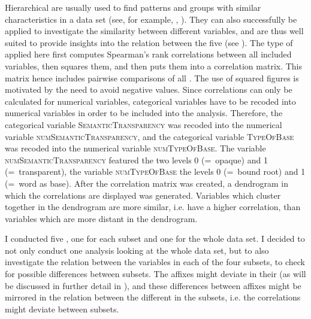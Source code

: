 Hierarchical  are usually used to find patterns and groups with similar characteristics in a data  set (see, for example, \citealt[chapter 5.1.5]{Baayen.2008}, \citealt[chapter 8.1]{Zumel.2014}). They can also successfully be applied to investigate the similarity between different variables, and are thus well suited to provide insights into the relation between the five  (see \citealt[200 f.]{Baayen.2008}). 
The type of  applied here first computes Spearman's rank correlations between all included variables, then squares them, and then puts them into a correlation matrix. This matrix hence includes pairwise comparisons of all . The use of squared figures is motivated by the need to avoid negative values.
Since correlations can only be calculated for numerical variables,  categorical variables have to be recoded into numerical variables in order to be included into the analysis. 
Therefore, the categorical variable \textsc{SemanticTransparency}  was recoded into the numerical variable \textsc{numSemanticTransparency}, and the categorical variable \textsc{TypeOfBase} was recoded into the numerical variable \textsc{numTypeOfBase}.  The variable \textsc{numSemanticTransparency} featured  the two levels 0 (=~opaque) and 1 (=~transparent), the variable \textsc{numTypeOfBase} the levels 0 (=~bound root) and 1 (=~word as base). After the correlation matrix was created,  a dendrogram in which the correlations are displayed was generated. Variables which cluster together in the dendrogram are more similar, i.e. have a higher correlation, than variables which are more distant in the dendrogram. 

I conducted five , one for each subset and one for the whole data set. 
I decided to not only conduct one analysis looking at the whole data set, but to also investigate the relation between the variables in each of the four subsets, to check for possible differences between subsets. The affixes might deviate in their  (as will be discussed in further detail in ), and these differences between affixes might be mirrored in the relation between the different  in the subsets, i.e. the correlations might deviate between subsets.

